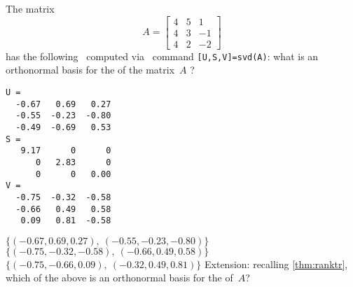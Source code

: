 \begin{activity}
The matrix
\begin{equation*}
A=\begin{bmatrix} 4&5&1
\\4&3&-1
\\4&2&-2 \end{bmatrix}
\end{equation*}
has the following \svd\ computed via \script\ command \verb|[U,S,V]=svd(A)|: what is an orthonormal basis for the  of the matrix~\(A\) \twodp?
\begin{verbatim}
U =
  -0.67   0.69   0.27
  -0.55  -0.23  -0.80
  -0.49  -0.69   0.53
S =
   9.17      0      0
      0   2.83      0
      0      0   0.00
V =
  -0.75  -0.32  -0.58
  -0.66   0.49   0.58
   0.09   0.81  -0.58
\end{verbatim}
{\(\{(-0.67,0.69,0.27),\ (-0.55,-0.23,-0.80)\}\)}
{\(\{(-0.75,-0.32,-0.58),\ (-0.66,0.49,0.58)\}\)}
{\(\{(-0.75,-0.66,0.09),\ (-0.32,0.49,0.81)\}\)}
Extension: recalling \autoref{thm:ranktr}, which of the above is an orthonormal basis for the  of~\(A\)?
\end{activity}




